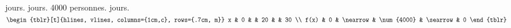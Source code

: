 %
%
    \begin{tasks}
         jours.
         jours.
        \task \num{4000} personnes.
         jours.
        \task
        $\begin{tblr}[t]{hlines, vlines, columns={1cm,c}, rows={.7cm, m}}
                x    & 0 &          & 20         &          & 30 \\
                f(x) & 0 & \nearrow & \num{4000} & \searrow & 0
            \end{tblr}$
    \end{tasks}
